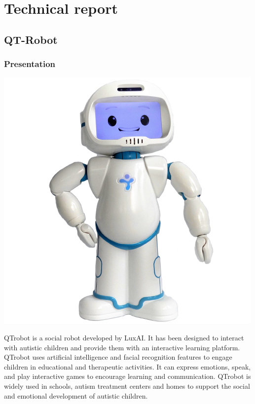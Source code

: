 \chapter{Technical report}

\section{QT-Robot}
\subsection{Presentation}
\begin{minipage}{.33\textwidth}%
\includegraphics[width=\textwidth]{Figures/qtrobot2.jpg}
\end{minipage}%
\hfill
\begin{minipage}{.5\textwidth}%
QTrobot is a social robot developed by LuxAI. It has been designed to interact with autistic children and provide them with an interactive learning platform. QTrobot uses artificial intelligence and facial recognition features to engage children in educational and therapeutic activities. It can express emotions, speak, and play interactive games to encourage learning and communication. QTrobot is widely used in schools, autism treatment centers and homes to support the social and emotional development of autistic children.\\
\end{minipage}%

